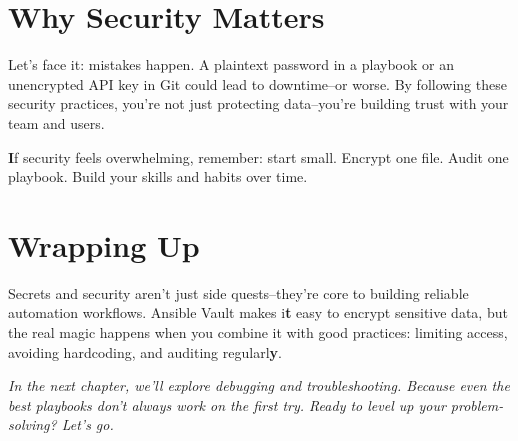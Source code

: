 \section{Why Security Matters}

Let's face it: mistakes happen. A plaintext password in a playbook or an unencrypted API key in Git could lead to downtime--or worse. By following these security practices, you're not just protecting data--you're building trust with your team and users.

\textbf{I}f security feels overwhelming, remember: start small. Encrypt one file. Audit one playbook. Build your skills and habits over time.


\section{Wrapping Up}

Secrets and security aren't just side quests--they're core to building reliable automation workflows. Ansible Vault makes i\textbf{t} easy to encrypt sensitive data, but the real magic happens when you combine it with good practices: limiting access, avoiding hardcoding, and auditing regularl\textbf{y}.

\vspace{1em}

\textit{In the next chapter, we'll explore debugging and troubleshooting. Because even the best playbooks don't always work on the first try. Ready to level up your problem-solving? Let's go.}
